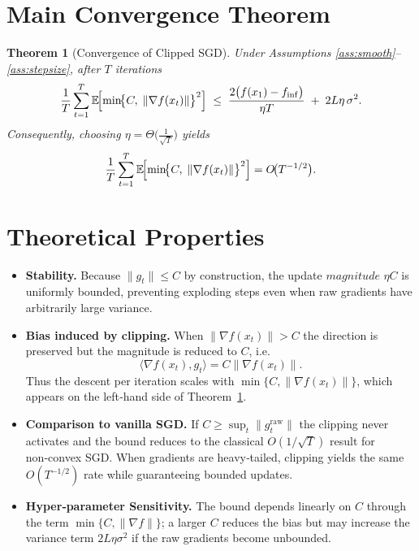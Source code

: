 \documentclass{article}
\newtheorem{theorem}{Theorem}
\begin{document}
\section*{Main Convergence Theorem}
\begin{theorem}[Convergence of Clipped SGD]\label{thm:main}
Under Assumptions \ref{ass:smooth}–\ref{ass:stepsize}, after $T$ iterations
\[
\frac{1}{T}\sum_{t=1}^{T}
\mathbb{E}\!\Bigl[\min\!\bigl\{C,\;\|\nabla f(x_t)\|\bigr\}^2\Bigr]
\;\le\;
\frac{2\bigl(f(x_1)-f_{\inf}\bigr)}{\eta T}
\;+\;
2L\eta\,\sigma^2 .
\]
Consequently, choosing $\eta=\Theta\bigl(\tfrac{1}{\sqrt{T}}\bigr)$ yields
\[
\frac{1}{T}\sum_{t=1}^{T}
\mathbb{E}\!\Bigl[\min\!\bigl\{C,\;\|\nabla f(x_t)\|\bigr\}^2\Bigr]
= O\!\bigl(T^{-1/2}\bigr).
\]
\end{theorem}

\section*{Theoretical Properties}
\begin{itemize}[leftmargin=*]
\item \textbf{Stability.} Because $ \|g_t\|\le C$ by construction, the update
$magnitude$ $\eta C$ is uniformly bounded, preventing exploding steps even
when raw gradients have arbitrarily large variance.
\item \textbf{Bias induced by clipping.}
When $\|\nabla f(x_t)\|>C$ the direction is preserved but the magnitude is
reduced to $C$, i.e.
\[
\langle \nabla f(x_t),g_t\rangle = C\|\nabla f(x_t)\| .
\]
Thus the descent per iteration scales with $\min\{C,\|\nabla f(x_t)\|\}$,
which appears on the left‑hand side of Theorem~\ref{thm:main}.
\item \textbf{Comparison to vanilla SGD.}
If $C\ge \sup_t\|g_t^{\text{raw}}\|$ the clipping never activates and the bound
reduces to the classical $O(1/\sqrt{T})$ result for non‑convex SGD.
When gradients are heavy‑tailed, clipping yields the same $O(T^{-1/2})$ rate
while guaranteeing bounded updates.
\item \textbf{Hyper‑parameter Sensitivity.}
The bound depends linearly on $C$ through the term
$\min\{C,\|\nabla f\|\}$; a larger $C$ reduces the bias but may increase
the variance term $2L\eta\sigma^2$ if the raw gradients become unbounded.
\end{itemize}
\end{document}
